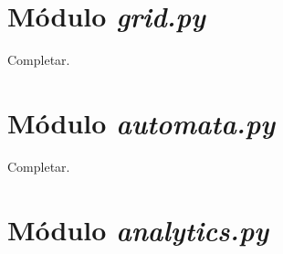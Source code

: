 \section{Módulo \textit{grid.py}}

Completar.

\section{Módulo \textit{automata.py}}

Completar.

\section{Módulo \textit{analytics.py}}
